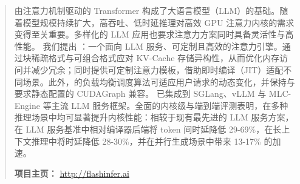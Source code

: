 \begin{abstract}

由注意力机制驱动的 Transformer 构成了大语言模型（LLM）的基础。随着模型规模持续扩大，高吞吐、低时延推理对高效 GPU 注意力内核的需求变得至关重要。多样化的 LLM 应用也要求注意力方案同时具备灵活性与高性能。
我们提出 \sys：一个面向 LLM 服务、可定制且高效的注意力引擎。\sys 通过块稀疏格式与可组合格式应对 KV-Cache 存储异构性，从而优化内存访问并减少冗余；同时提供可定制注意力模板，借助即时编译（JIT）适配不同场景。此外，\sys 的负载均衡调度算法可适应用户请求的动态变化，并保持与要求静态配置的 CUDAGraph 兼容。
\sys 已集成到 SGLang、vLLM 与 MLC-Engine 等主流 LLM 服务框架。全面的内核级与端到端评测表明，\sys 在多种推理场景中均可显著提升内核性能：相较于现有最先进的 LLM 服务方案，
\sys 在 LLM 服务基准中相对编译器后端将 token 间时延降低 29-69\%，在长上下文推理中将时延降低 28-30\%，并在并行生成场景中带来 13-17\% 的加速。\newline

\textbf{项目主页：} \url{http://flashinfer.ai}

\end{abstract}
